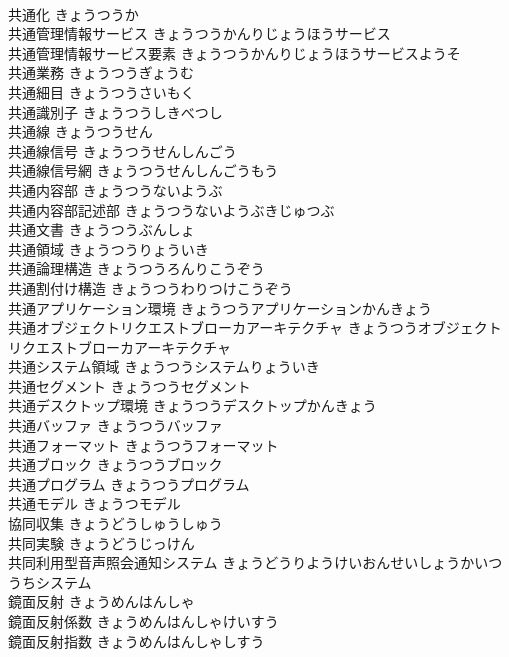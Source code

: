 \documentclass[8pt]{extreport}
\begin{document}
\begin{CJK}{UTF8}{min}
\\	共通化	きょうつうか	
\\	共通管理情報サービス	きょうつうかんりじょうほうサービス	
\\	共通管理情報サービス要素	きょうつうかんりじょうほうサービスようそ	
\\	共通業務	きょうつうぎょうむ	
\\	共通細目	きょうつうさいもく	
\\	共通識別子	きょうつうしきべつし	
\\	共通線	きょうつうせん	
\\	共通線信号	きょうつうせんしんごう	
\\	共通線信号網	きょうつうせんしんごうもう	
\\	共通内容部	きょうつうないようぶ	
\\	共通内容部記述部	きょうつうないようぶきじゅつぶ	
\\	共通文書	きょうつうぶんしょ	
\\	共通領域	きょうつうりょういき	
\\	共通論理構造	きょうつうろんりこうぞう	
\\	共通割付け構造	きょうつうわりつけこうぞう	
\\	共通アプリケーション環境	きょうつうアプリケーションかんきょう	
\\	共通オブジェクトリクエストブローカアーキテクチャ	きょうつうオブジェクトリクエストブローカアーキテクチャ	
\\	共通システム領域	きょうつうシステムりょういき	
\\	共通セグメント	きょうつうセグメント	
\\	共通デスクトップ環境	きょうつうデスクトップかんきょう	
\\	共通バッファ	きょうつうバッファ	
\\	共通フォーマット	きょうつうフォーマット	
\\	共通ブロック	きょうつうブロック	
\\	共通プログラム	きょうつうプログラム	
\\	共通モデル	きょうつモデル	
\\	協同収集	きょうどうしゅうしゅう	
\\	共同実験	きょうどうじっけん	
\\	共同利用型音声照会通知システム	きょうどうりようけいおんせいしょうかいつうちシステム	
\\	鏡面反射	きょうめんはんしゃ	
\\	鏡面反射係数	きょうめんはんしゃけいすう	
\\	鏡面反射指数	きょうめんはんしゃしすう	

\end{CJK}
\end{document}
